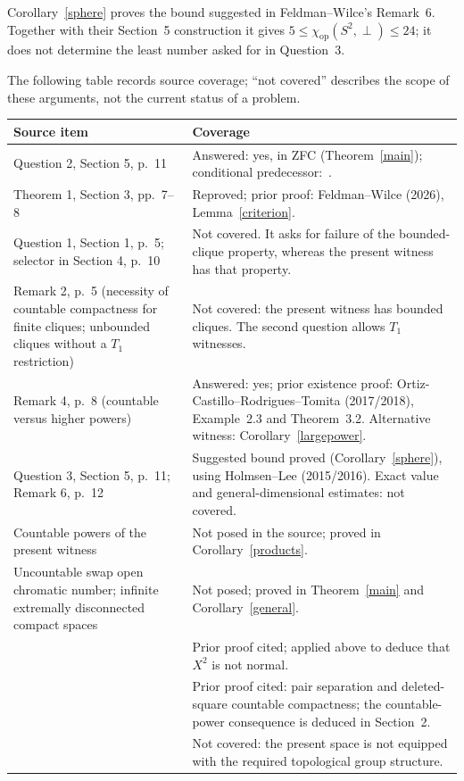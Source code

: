 \documentclass[11pt]{article}
\newcommand{\op}{\mathrm{op}}
\begin{document}
Corollary~\ref{sphere} proves the bound suggested in
Feldman--Wilce's Remark~6. Together with their Section~5 construction
it gives $5\le\chi_\op(S^2,\perp)\le24$; it does not determine the
least number asked for in Question~3.

The following table records source coverage; ``not covered'' describes
the scope of these arguments, not the current status of a problem.
\begin{longtable}{>{\raggedright\arraybackslash}p{.34\linewidth}>{\raggedright\arraybackslash}p{.56\linewidth}}
\hline
Source item & Coverage\\
\hline
Question 2, Section 5, p.~11 & Answered: yes, in ZFC (Theorem~\ref{main});
conditional predecessor:~\cite[Example~2.3]{BHM}.\\
Theorem 1, Section 3, pp.~7--8 & Reproved; prior proof:
Feldman--Wilce (2026), Lemma~\ref{criterion}.\\
Question 1, Section 1, p.~5; selector in Section 4, p.~10 &
Not covered. It asks for failure of the bounded-clique property,
whereas the present witness has that property.\\
Remark 2, p.~5 (necessity of countable compactness for finite cliques;
unbounded cliques without a $T_1$ restriction) & Not covered: the present
witness has bounded cliques. The second question allows $T_1$ witnesses.\\
Remark 4, p.~8 (countable versus higher powers) & Answered: yes;
prior existence proof: Ortiz-Castillo--Rodrigues--Tomita (2017/2018),
Example~2.3 and Theorem~3.2. Alternative witness:
Corollary~\ref{largepower}.\\
Question 3, Section 5, p.~11; Remark 6, p.~12 &
Suggested bound proved (Corollary~\ref{sphere}), using
Holmsen--Lee (2015/2016). Exact value and general-dimensional estimates:
not covered.\\
Countable powers of the present witness & Not posed in the source;
proved in Corollary~\ref{products}.\\
Uncountable swap open chromatic number; infinite extremally disconnected
compact spaces & Not posed; proved in Theorem~\ref{main} and
Corollary~\ref{general}.\\
\cite[Theorem 2.1, p.~28]{BHM} & Prior proof cited; applied above
to deduce that $X^2$ is not normal.\\
\cite[Lemmas 2.1--2.2, pp.~211--212]{PPS} & Prior proof cited:
pair separation and deleted-square countable compactness;
the countable-power consequence is deduced in Section~2.\\
\cite[Question 1.1, p.~27; Question 5.3, p.~39]{BHM} &
Not covered: the present space is not equipped with the required
topological group structure.\\
\hline
\end{longtable}
\end{document}
